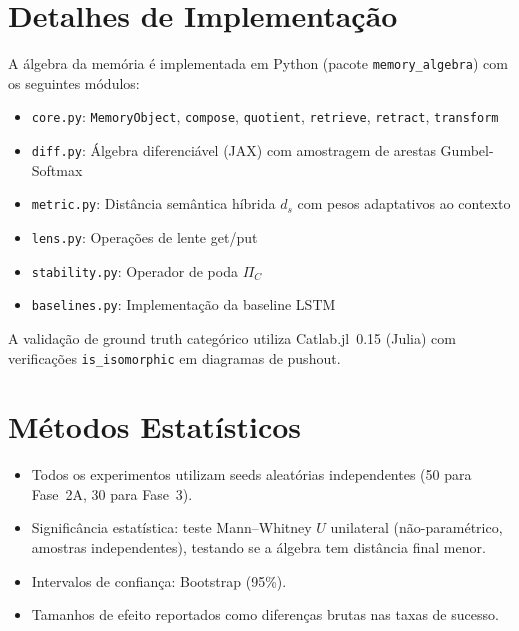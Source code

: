 \documentclass[11pt,a4paper]{article}
\theoremstyle{definition}
\begin{document}
\appendix

\section{Detalhes de Implementa\c{c}\~ao}

A \'algebra da mem\'oria \'e implementada em Python (pacote \mbox{\texttt{memory\_algebra}}) com os seguintes m\'odulos:

\begin{itemize}
    \item \texttt{core.py}: \texttt{MemoryObject}, \texttt{compose}, \texttt{quotient}, \texttt{retrieve}, \texttt{retract}, \texttt{transform}
    \item \texttt{diff.py}: \'Algebra diferenci\'avel (JAX) com amostragem de arestas Gumbel-Softmax
    \item \texttt{metric.py}: Dist\^ancia sem\^antica h\'ibrida $d_s$ com pesos adaptativos ao contexto
    \item \texttt{lens.py}: Opera\c{c}\~oes de lente get/put
    \item \texttt{stability.py}: Operador de poda $\Pi_C$
    \item \texttt{baselines.py}: Implementa\c{c}\~ao da baseline LSTM
\end{itemize}

A valida\c{c}\~ao de ground truth categ\'orico utiliza Catlab.jl~0.15 (Julia) com verifica\c{c}\~oes \texttt{is\_isomorphic} em diagramas de pushout.

\section{M\'etodos Estat\'isticos}

\begin{itemize}
    \item Todos os experimentos utilizam seeds aleat\'orias independentes (50 para Fase~2A, 30 para Fase~3).
    \item Signific\^ancia estat\'istica: teste Mann--Whitney $U$ unilateral (n\~ao-param\'etrico, amostras independentes), testando se a \'algebra tem dist\^ancia final menor.
    \item Intervalos de confian\c{c}a: Bootstrap (95\%).
    \item Tamanhos de efeito reportados como diferen\c{c}as brutas nas taxas de sucesso.
\end{itemize}
\end{document}
